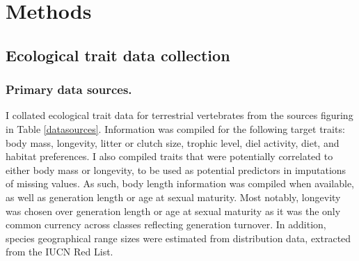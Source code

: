 \section{Methods}

\subsection{Ecological trait data collection}

\subsubsection{Primary data sources.}
I collated ecological trait data for terrestrial vertebrates from the sources figuring in Table \ref{datasources}. Information was compiled for the following target traits: body mass, longevity, litter or clutch size, trophic level, diel activity, diet, and habitat preferences. I also compiled traits that were potentially correlated to either body mass or longevity, to be used as potential predictors in imputations of missing values. As such, body length information was compiled when available, as well as generation length or age at sexual maturity. Most notably, longevity was chosen over generation length or age at sexual maturity as it was the only common currency across classes reflecting generation turnover. In addition, species geographical range sizes were estimated from distribution data, extracted from the IUCN Red List.

